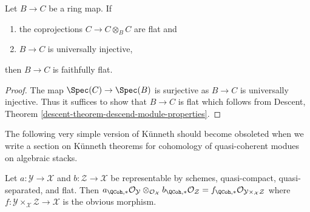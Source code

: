 \begin{lemma}
\label{lemma-flat}
Let $B \to C$ be a ring map. If
\begin{enumerate}
\item the coprojections $C \to C \otimes_B C$ are flat and
\item $B \to C$ is universally injective,
\end{enumerate}
then $B \to C$ is faithfully flat.
\end{lemma}

\begin{proof}
The map $\Spec(C) \to \Spec(B)$ is surjective as $B \to C$ is universally
injective. Thus it suffices to show that $B \to C$ is flat
which follows from
Descent, Theorem \ref{descent-theorem-descend-module-properties}.
\end{proof}

\noindent
The following very simple version of K\"unneth should become
obsoleted when we write a section on K\"unneth theorems for
cohomology of quasi-coherent modues on algebraic stacks.

\begin{lemma}
\label{lemma-easy-kunneth}
Let $a : \mathcal{Y} \to \mathcal{X}$ and $b : \mathcal{Z} \to \mathcal{X}$
be representable by schemes, quasi-compact, quasi-separated, and flat.
Then $a_{\QCoh, *}\mathcal{O}_\mathcal{Y}
\otimes_{\mathcal{O}_\mathcal{X}}
b_{\QCoh, *}\mathcal{O}_\mathcal{Z} =
f_{\QCoh, *}\mathcal{O}_{\mathcal{Y} \times_\mathcal{X} \mathcal{Z}}$
where $f : \mathcal{Y} \times_\mathcal{X} \mathcal{Z} \to \mathcal{X}$
is the obvious morphism.
\end{lemma}

